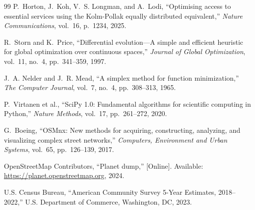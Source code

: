 \documentclass[conference]{IEEEtran}
\begin{document}
\begin{thebibliography}{99}
P.~Horton, J.~Koh, V.~S. Longman, and A.~Lodi, ``Optimising access
to essential services using the Kolm-Pollak equally distributed
equivalent,'' \textit{Nature Communications}, vol.~16, p.~1234, 2025.

R.~Storn and K.~Price, ``Differential evolution---A simple and
efficient heuristic for global optimization over continuous spaces,''
\textit{Journal of Global Optimization}, vol.~11, no.~4,
pp.~341--359, 1997.

J.~A. Nelder and J.~R. Mead, ``A simplex method for function
minimization,'' \textit{The Computer Journal}, vol.~7, no.~4,
pp.~308--313, 1965.

P.~Virtanen et al., ``SciPy 1.0: Fundamental algorithms for
scientific computing in Python,'' \textit{Nature Methods}, vol.~17,
pp.~261--272, 2020.

G.~Boeing, ``OSMnx: New methods for acquiring, constructing,
analyzing, and visualizing complex street networks,''
\textit{Computers, Environment and Urban Systems}, vol.~65,
pp.~126--139, 2017.

OpenStreetMap Contributors, ``Planet dump,'' [Online]. Available:
\url{https://planet.openstreetmap.org}, 2024.

U.S. Census Bureau, ``American Community Survey 5-Year Estimates,
2018--2022,'' U.S. Department of Commerce, Washington, DC, 2023.

\end{thebibliography}
\end{document}
